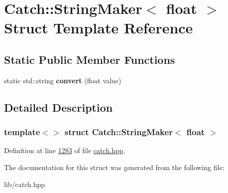 \hypertarget{structCatch_1_1StringMaker_3_01float_01_4}{}\section{Catch\+::String\+Maker$<$ float $>$ Struct Template Reference}
\label{structCatch_1_1StringMaker_3_01float_01_4}
\subsection*{Static Public Member Functions}
\begin{DoxyCompactItemize}
\item 
\mbox{\label{structCatch_1_1StringMaker_3_01float_01_4_a7ffacc6fa46a338200f3fbb2ee078648}} 
static std\+::string {\bfseries convert} (float value)
\end{DoxyCompactItemize}


\subsection{Detailed Description}
\subsubsection*{template$<$$>$\newline
struct Catch\+::\+String\+Maker$<$ float $>$}



Definition at line \mbox{\hyperlink{catch_8hpp_source_l01283}{1283}} of file \mbox{\hyperlink{catch_8hpp_source}{catch.\+hpp}}.



The documentation for this struct was generated from the following file\+:\begin{DoxyCompactItemize}
\item 
lib/catch.\+hpp\end{DoxyCompactItemize}
